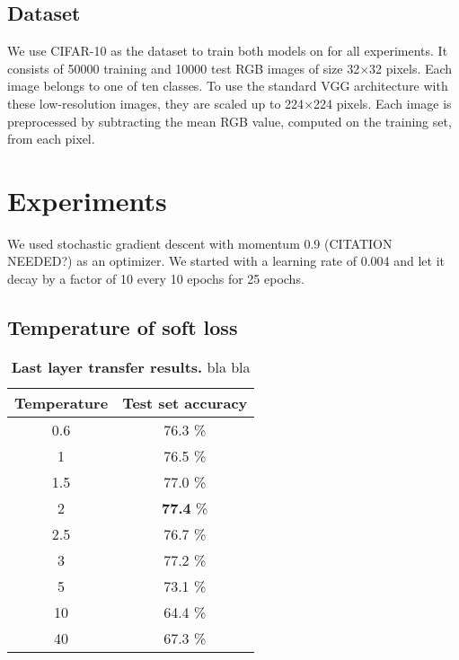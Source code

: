 \documentclass[10pt,twocolumn,letterpaper]{article}
\begin{document}
\subsection{Dataset}
We use CIFAR-10 \cite{krizhevsky2009learning} as the dataset to train both models on for all experiments. It consists of 50000 training and 10000 test RGB images of size 32$\times$32 pixels. Each image belongs to one of ten classes. To use the standard VGG architecture with these low-resolution images, they are scaled up to 224$\times$224 pixels. Each image is preprocessed by subtracting the mean RGB value, computed on the training set, from each pixel. 
 

\section{Experiments}
We used stochastic gradient descent with momentum 0.9 (CITATION NEEDED?) as an optimizer. We started with a learning rate of 0.004 and let it decay by a factor of 10 every 10 epochs for 25 epochs. 

\subsection{Temperature of soft loss}
\begin{table}[]
	\begin{center}
	\begin{tabular}{|c|c|}
		\hline
		Temperature	&	Test set accuracy\\ \hline
		0.6	&	76.3 \%	\\ \hline
		1	&	76.5 \%	\\ \hline
		1.5	&	77.0 \%	\\ \hline
		2	&	\textbf{77.4} \%	\\ \hline
		2.5	&	76.7 \%	\\ \hline
		3	&	77.2 \%	\\ \hline
		5	&	73.1 \%	\\ \hline
		10	&	64.4 \%	\\ \hline
		40	&	67.3 \%	\\ \hline
	\end{tabular}
	\end{center}
	\caption{\textbf{Last layer transfer results.} bla bla}
	\label{tab:LL_results}
\end{table}
\end{document}
